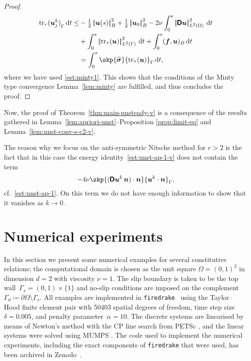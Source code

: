 \documentclass[reqno,a4paper]{amsart}
\def\norm#1{\left|\!\left| #1 \right|\!\right|}
\def\tens#1{\pmb{\mathsf{#1}}}
\def\vec#1{\boldsymbol{#1}}
\def\tr{\mathop{\mathrm{tr}}\nolimits}
\def\d{{\rm d}}
\def\dt{\,\d t}
\def\Du{\BD\bu}
\def\bf{\vec{f}}
\def\bn{\vec{n}}
\def\bu{\vec{u}}
\def\bsigma{\vec{\sigma}}
\def\BD{\tens{D}}
\begin{document}
\begin{proof}
\begin{equation}
\begin{aligned}
{				}{\tr_{\tau}(\bu^k_j) }_{\Gamma} \dt 
				\leq & 
				- \tfrac{1}{2} \norm{ \bu(s)}_{B}^2 
				+  	\tfrac{1}{2}  \norm{\bu_0}_{B}^2	- 2 \nu \int_{0}^{s} \norm{\BD \bu}_{L^2(\Omega)}^2 \dt 
				\\
				&
				+  	 \int_{0}^{s} \norm{\tr_{\tau}(\bu)}_{L^2(\Gamma)}^2 \dt
				+   \int_{0}^{s}({\bf},{\bu})_B \dt\\
				&= 
				\int_{0}^s \skp{\widehat{\bsigma}}{\tr_{\tau}(\bu)}_{\Gamma} \dt,
			\end{aligned}
		\end{equation}
		where we have used \eqref{est:minty1}. 
		This shows that the conditions of the Minty type convergence Lemma~\ref{lem:minty} are fulfilled, and thus concludes the proof. 
	\end{proof}

{Now, the proof of Theorem~\ref{thm:main-unsteady-v} is a consequence of the results gathered in Lemma~\ref{lem:apriori-unst}--Proposition \ref{prop:limit-eq} and Lemma~\ref{lem:unst-conv-s-c2-v}.}
	
	\begin{remark}
		The reason why we focus on the anti-symmetric Nitsche method for $r>2$ is the fact that in this case the energy identity~\eqref{est:unst-ap-1-v} does not contain the term 
		\begin{align*}
			- 4 \nu \skp{(\Du^k \, \bn)\cdot \bn}{\bu^k \cdot \bn}_{\Gamma},
		\end{align*}
		cf.~\eqref{est:unst-ap-1}. On this term we do not have enough information to show that it vanishes as $k \to 0$. 
	\end{remark}
	
	
	\section{Numerical experiments}
	\label{sec:num-exp}
	\noindent
	In this section we present some numerical examples for several constitutive relations; the computational domain is chosen as the unit square $\Omega = (0,1)^2$ in dimension $d = 2$ with viscosity $\nu = 1$.
	The slip boundary is taken to be the top wall~$\Gamma_s = (0,1)\times \{1\}$ and no-slip conditions are imposed on the complement~$\Gamma_d\coloneqq \partial\Omega \setminus \Gamma_s$.
	All examples are implemented in \texttt{firedrake}~\cite{Firedrake} using the Taylor--Hood finite element pair with 50403 spatial degrees of freedom,  time step size~$\delta=0.005$, and  penalty parameter~$\alpha=10$.
	The discrete systems are linearised by means of Newton's method with the CP line search from PETSc \cite{petsc-user-ref}, and the linear systems were solved using MUMPS \cite{MUMPS}. 
	The code used to implement the numerical experiments, including the exact components of \texttt{firedrake} that were used, has been archived in Zenodo~\cite{zenodo}.
	
\end{document}
